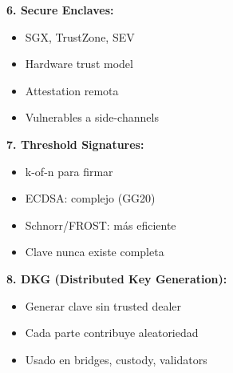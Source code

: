 \documentclass[11pt,a4paper,twoside]{book}
\theoremstyle{definition}
\theoremstyle{remark}
\begin{document}
\begin{keyidea}
\textbf{6. Secure Enclaves:}
\begin{itemize}
    \item SGX, TrustZone, SEV
    \item Hardware trust model
    \item Attestation remota
    \item Vulnerables a side-channels
\end{itemize}

\textbf{7. Threshold Signatures:}
\begin{itemize}
    \item k-of-n para firmar
    \item ECDSA: complejo (GG20)
    \item Schnorr/FROST: más eficiente
    \item Clave nunca existe completa
\end{itemize}

\textbf{8. DKG (Distributed Key Generation):}
\begin{itemize}
    \item Generar clave sin trusted dealer
    \item Cada parte contribuye aleatoriedad
    \item Usado en bridges, custody, validators
\end{itemize}
\end{keyidea}
\end{document}
